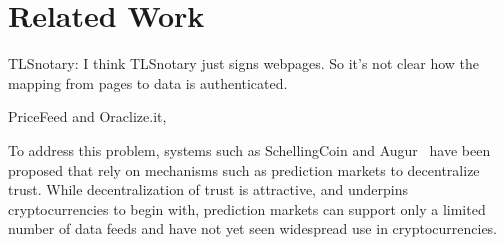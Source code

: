 \section{Related Work}
TLSnotary: I think TLSnotary just signs webpages. So it's not clear how the mapping from pages to data is authenticated.

PriceFeed and Oraclize.it, 

To address this problem, systems such as SchellingCoin and Augur~\cite{} have been proposed that rely on mechanisms such as prediction markets to decentralize trust. While decentralization of trust is attractive, and underpins cryptocurrencies to begin with, prediction markets can support only a limited number of data feeds and have not yet seen widespread use in cryptocurrencies. 